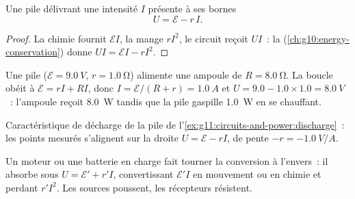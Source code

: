 \begin{proposition}\label{prop:g11:circuits-and-power:terminal}
Une pile délivrant une intensité $I$ présente à ses bornes
\[ U = \mathcal{E} - r\,I . \]
\end{proposition}

\begin{proof}
La chimie fournit $\mathcal{E}I$, la
 mange $rI^2$, le circuit reçoit
$UI$~: la 
(\cref{ch:g10:energy-conservation}) donne $UI = \mathcal{E}I - rI^2$.
\end{proof}

\begin{example}\label{ex:g11:circuits-and-power:discharge}
Une pile ($\mathcal{E} = \qty{9.0}{V}$, $r = \qty{1.0}{\ohm}$) alimente
une ampoule de  $R = \qty{8.0}{\ohm}$.
La boucle obéit à $\mathcal{E} = rI + RI$, donc
$I = \mathcal{E}/(R + r) = \qty{1.0}{A}$ et $U = 9.0 - 1.0 \times 1.0 =
\qty{8.0}{V}$~: l'ampoule reçoit \qty{8.0}{W} tandis que la pile gaspille
\qty{1.0}{W} en se chauffant.
\end{example}

\begin{omfigure}

{\small Caractéristique de décharge de la pile de
l'\cref{ex:g11:circuits-and-power:discharge}~: les points mesurés
s'alignent sur la droite $U = \mathcal{E} - rI$, de pente
$-r = \qty{-1.0}{V/A}$.}
\end{omfigure}

\begin{remark}[Récepteurs]\label{rem:g11:circuits-and-power:receivers}
Un moteur ou une batterie en charge fait tourner la conversion à
l'envers~: il absorbe sous $U = \mathcal{E}' + r'I$, convertissant
$\mathcal{E}'I$ en mouvement ou en chimie et perdant $r'I^2$. Les
sources poussent, les récepteurs résistent.
\end{remark}

